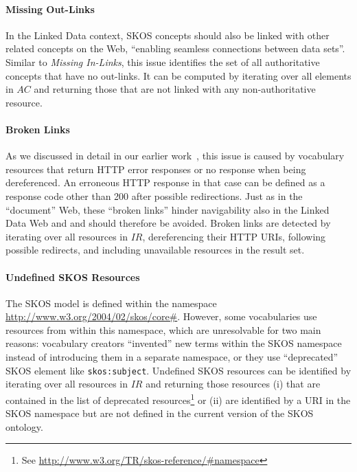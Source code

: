 \paragraph{Missing Out-Links}

In the Linked Data context, SKOS concepts should also be linked with other related concepts on the Web, ``enabling seamless connections between data sets''\cite{Heath2011}. Similar to \emph{Missing In-Links}, this issue identifies the set of all authoritative concepts that have no out-links.
It can be computed by iterating over all elements in $AC$ and returning those that are not linked with any non-authoritative resource.

\paragraph{Broken Links}

As we discussed in detail in our earlier work~\cite{Popitsch:2010:DHB:1772690.1772768}, this issue is caused by vocabulary resources that return HTTP error responses or no response when being dereferenced. An erroneous HTTP response in that case can be defined as a response code other than 200 after possible redirections. Just as in the ``document'' Web, these ``broken links'' hinder navigability also in the Linked Data Web and and should therefore be avoided. 
Broken links are detected by iterating over all resources in $IR$, dereferencing their HTTP URIs, following possible redirects, and including unavailable resources in the result set.

\paragraph{Undefined SKOS Resources}

The SKOS model is defined within the namespace \url{http://www.w3.org/2004/02/skos/core#}. However, some vocabularies use resources from within this namespace, which are unresolvable for two main reasons: vocabulary creators ``invented'' new terms within the SKOS namespace instead of introducing them in a separate namespace, or they use ``deprecated'' SKOS element like \texttt{skos:subject}.
Undefined SKOS resources can be identified by iterating over all resources in $IR$ and returning those resources (i) that are contained in the list of deprecated resources\footnote{See \url{http://www.w3.org/TR/skos-reference/#namespace}} or (ii) are identified by a URI in the SKOS namespace but are not defined in the current version of the SKOS ontology.
